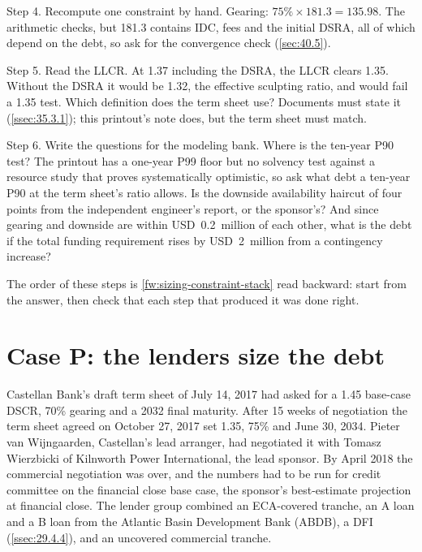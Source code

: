 Step 4. Recompute one constraint by hand. Gearing: $75\% \times 181.3 = 135.98$. The arithmetic checks, but 181.3 contains IDC, fees and the initial DSRA, all of which depend on the debt, so ask for the convergence check (\cref{sec:40.5}).

Step 5. Read the LLCR. At 1.37\x{} including the DSRA, the LLCR clears 1.35\x. Without the DSRA it would be 1.32\x, the effective sculpting ratio, and would fail a 1.35\x{} test. Which definition does the term sheet use? Documents must state it (\cref{ssec:35.3.1}); this printout's note does, but the term sheet must match.

Step 6. Write the questions for the modeling bank. Where is the ten-year P90 test? The printout has a one-year P99 floor but no solvency test against a resource study that proves systematically optimistic, so ask what debt a ten-year P90 at the term sheet's ratio allows. Is the downside availability haircut of four points from the independent engineer's report, or the sponsor's? And since gearing and downside are within USD~0.2~million of each other, what is the debt if the total funding requirement rises by USD~2~million from a contingency increase?

The order of these steps is \cref{fw:sizing-constraint-stack} read backward: start from the answer, then check that each step that produced it was done right.

\section{Case P: the lenders size the debt}\label{sec:36.12}

Castellan Bank's draft term sheet of July 14, 2017 had asked for a 1.45\x{} base-case DSCR, 70\% gearing and a 2032 final maturity. After 15 weeks of negotiation the term sheet agreed on October 27, 2017 set 1.35\x, 75\% and June 30, 2034. Pieter van Wijngaarden, Castellan's lead arranger, had negotiated it with Tomasz Wierzbicki of Kilnworth Power International, the lead sponsor. By April 2018 the commercial negotiation was over, and the numbers had to be run for credit committee on the financial close base case, the sponsor's best-estimate projection at financial close. The lender group combined an ECA-covered tranche, an A loan and a B loan from the Atlantic Basin Development Bank (ABDB), a DFI (\cref{ssec:29.4.4}), and an uncovered commercial tranche.


